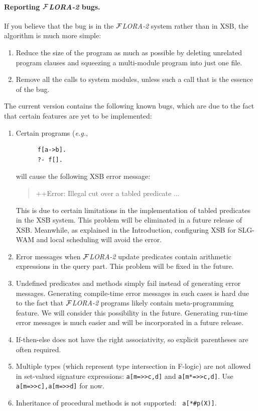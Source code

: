 \documentclass[11pt]{article}
\newcommand{\FLORA}{{\mbox{${\cal F}${\small\it LORA}\rm\emph{-2}}}\xspace}
\newcommand{\fl}{\mbox{F-logic}\xspace}
\begin{document}
\paragraph{Reporting \FLORA bugs.}
If you believe that the bug is in the \FLORA system rather than in XSB,
the algorithm is much more simple: 
\begin{enumerate}
  \item Reduce the size of the program as much as possible by deleting 
    unrelated program clauses and squeezing a multi-module program into
    just one file.
  \item Remove all the calls to system modules, unless such a call that is
    the essence of the bug.
\end{enumerate}

The current version contains the following known bugs, which are due to the
fact that certain features are yet to be implemented:
\begin{enumerate}
  \item  Certain programs ({\it e.g.}, 
    \begin{verbatim}
      f[a->b].
      ?- f[].      
    \end{verbatim}
    will cause the following XSB error message:
    \begin{quote}
     ++Error: Illegal cut over a tabled predicate ...      
    \end{quote}
    This is due to certain limitations in the implementation of tabled
    predicates in the XSB system. This problem will be eliminated in a
    future release of XSB. Meanwhile, as explained in the Introduction,
    configuring XSB for SLG-WAM and local scheduling will avoid the error.
  \item Error messages when \FLORA update predicates contain arithmetic
    expressions in the query part. This problem will be fixed in the
    future.
  \item Undefined predicates and methods simply fail instead of generating
    error messages. Generating compile-time error messages in such cases is
    hard due to the fact that \FLORA programs likely contain
    meta-programming feature. We will consider this possibility in the
    future. Generating run-time error messages is much easier and will be
    incorporated in a future release.
  \item If-then-else does not have the right associativity, so explicit
    parentheses are often required.
  \item Multiple types (which represent type intersection in \fl) are not
    allowed in set-valued signature expressions: {\tt a[m=>>{c,d}]} and
    {\tt a[m*=>>{c,d}]}. Use {\tt a[m=>>c],a[m=>>d]} for now.
  \item Inheritance of procedural methods is not supported: {\tt
      a[*\#p(X)]}.
\end{enumerate}
\end{document}

